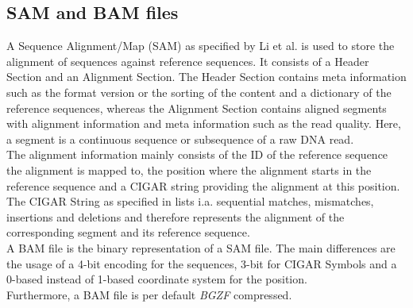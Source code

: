 \subsection{SAM and BAM files}
A Sequence Alignment/Map (SAM) as specified by Li et al. \cite{samformat} is used to store the alignment of sequences against reference sequences. It consists of a Header Section and an Alignment Section. The Header Section contains meta information such as the format version or the sorting of the content and a dictionary of the reference sequences, whereas the Alignment Section contains aligned segments with alignment information and meta information such as the read quality. Here, a segment is a continuous sequence or subsequence of a raw DNA read. \\
The alignment information mainly consists of the ID of the reference sequence the alignment is mapped to, the position where the alignment starts in the reference sequence and a CIGAR string providing the alignment at this position. The CIGAR String as specified in \cite{samformat} lists i.a. sequential matches, mismatches, insertions and deletions and therefore represents the alignment of the corresponding segment and its reference sequence. \\
A BAM file is the binary representation of a SAM file. The main differences are the usage of a 4-bit encoding for the sequences, 3-bit for CIGAR Symbols and a 0-based instead of 1-based coordinate system for the position. \\
Furthermore, a BAM file is per default \textit{BGZF} compressed.

